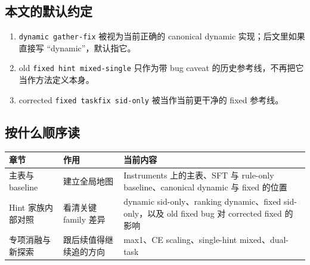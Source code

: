 \subsection{本文的默认约定}

\begin{enumerate}
\item \texttt{dynamic gather-fix} 被视为当前正确的 canonical dynamic 实现；后文里如果直接写 “dynamic”，默认指它。
\item old \texttt{fixed hint mixed-single} 只作为带 bug caveat 的历史参考线，不再把它当作方法定义本身。
\item corrected \texttt{fixed taskfix sid-only} 被当作当前更干净的 fixed 参考线。
\end{enumerate}

\subsection{按什么顺序读}

\begin{table}[H]
\centering
\small
\begin{tabular}{p{4.0cm}p{3.0cm}p{5.5cm}}
\toprule
章节 & 作用 & 当前内容 \\
\midrule
主表与 baseline & 建立全局地图 & Instruments 上的主表、SFT 与 rule-only baseline、canonical dynamic 与 fixed 的位置 \\
Hint 家族内部对照 & 看清关键 family 差异 & dynamic sid-only、ranking dynamic、fixed sid-only，以及 old fixed bug 对 corrected fixed 的影响 \\
专项消融与新探索 & 跟后续值得继续追的方向 & max1、CE scaling、single-hint mixed、dual-task \\
\bottomrule
\end{tabular}
\end{table}
